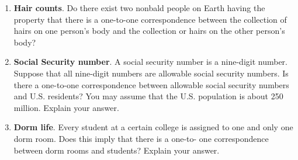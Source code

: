 \begin{enumerate}
%

\vfill 

\item \textbf{Hair counts}. Do there exist two nonbald people on Earth having the property that there is a one-to-one correspondence between the collection of hairs on one person's body and the collection or hairs on the other person's body? 

\vfill \item \textbf{Social Security number}. A social security number is a nine-digit number. Suppose that all nine-digit numbers are allowable social security numbers. Is there a one-to-one correspondence between allowable social security numbers and U.S. residents? You may assume that the U.S. population is about 250 million. Explain your answer.



\vfill \item \textbf{Dorm life}. Every student at a certain college is assigned to one and only one dorm room. Does this imply that there is a one-to- one correspondence between dorm rooms and students? Explain your answer. \vfill
\end{enumerate}

